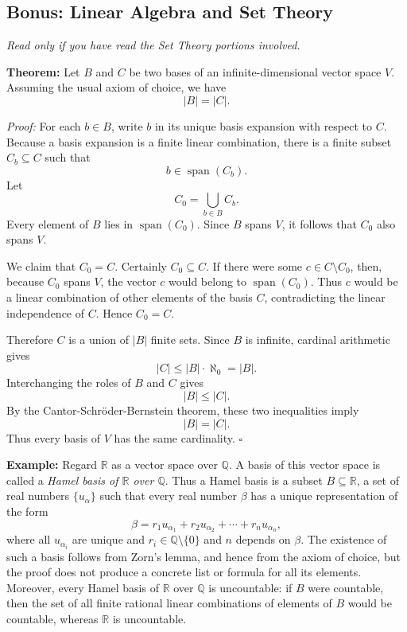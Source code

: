 \documentclass[a4paper,11pt,abstract=true]{scrartcl}
\theoremstyle{dotlessP}
\theoremstyle{dotlessS}
\theoremstyle{remark}
\theoremstyle{definition}
\begin{document}
\subsection{Bonus: Linear Algebra and Set Theory}
\textit{Read only if you have read the Set Theory portions involved.}

\begin{problem_box}
\textbf{Theorem:} Let $B$ and
$C$ be two bases of an infinite-dimensional vector space $V$. Assuming the
usual axiom of choice, we have
\[
|B|=|C|.
\]

\end{problem_box}

\begin{claim_box}
\textit{Proof:} For each $b\in B$, write $b$ in its unique basis expansion
with respect to $C$. Because a basis expansion is a finite linear combination,
there is a finite subset $C_b\subseteq C$ such that
\[
b\in\operatorname{span}(C_b).
\]
Let
\[
C_0=\bigcup_{b\in B}C_b.
\]
Every element of $B$ lies in $\operatorname{span}(C_0)$. Since $B$ spans
$V$, it follows that $C_0$ also spans $V$.

We claim that $C_0=C$. Certainly $C_0\subseteq C$. If there were some
$c\in C\setminus C_0$, then, because $C_0$ spans $V$, the vector $c$ would
belong to $\operatorname{span}(C_0)$. Thus $c$ would be a linear combination
of other elements of the basis $C$, contradicting the linear independence of
$C$. Hence $C_0=C$.

Therefore $C$ is a union of $|B|$ finite sets. Since $B$ is infinite,
cardinal arithmetic gives
\[
|C|\leq |B|\cdot\aleph_0=|B|.
\]
Interchanging the roles of $B$ and $C$ gives
\[
|B|\leq |C|.
\]
By the Cantor-Schr\"oder-Bernstein theorem, these two inequalities imply
\[
|B|=|C|.
\]
Thus every basis of $V$ has the same cardinality. \hfill$\square$
\end{claim_box}

\begin{example_box}
\textbf{Example:} Regard $\mathbb{R}$ as
a vector space over $\mathbb{Q}$. A basis of this vector space is called a
\emph{Hamel basis of $\mathbb{R}$ over $\mathbb{Q}$}. Thus a Hamel basis is a
subset $B\subseteq\mathbb{R}$, a set of real numbers $\{u_\alpha\}$ such that every real number $\beta$ has a unique representation of the form
\[
\beta = r_1 u_{\alpha_1} + r_2 u_{\alpha_2} + \cdots + r_n u_{\alpha_n},
\]
where all $u_{\alpha_i}$ are unique and $r_i\in\mathbb{Q}\setminus\{0\}$ and $n$ depends on $\beta$.
The existence of such a basis follows from Zorn's lemma, and hence from the
axiom of choice, but the proof does not produce a concrete list or formula
for all its elements. Moreover, every Hamel basis of $\mathbb{R}$ over
$\mathbb{Q}$ is uncountable: if $B$ were countable, then the set of all finite
rational linear combinations of elements of $B$ would be countable, whereas
$\mathbb{R}$ is uncountable. 
\end{example_box}
\end{document}
